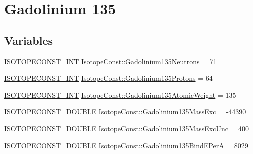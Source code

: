\hypertarget{group___isotope_const-_gadolinium-_gd135}{}\section{Gadolinium 135}
\label{group___isotope_const-_gadolinium-_gd135}
\subsection*{Variables}
\begin{DoxyCompactItemize}
\item 
\mbox{\hyperlink{group___isotope_const-_macros_ga5f18360b3e99483a35c32d789e62621c}{I\+S\+O\+T\+O\+P\+E\+C\+O\+N\+S\+T\+\_\+\+I\+NT}} \mbox{\hyperlink{group___isotope_const-_gadolinium-_gd135_ga8aeae2864824ab8d56d0caeed819ddb6}{Isotope\+Const\+::\+Gadolinium135\+Neutrons}} = 71
\item 
\mbox{\hyperlink{group___isotope_const-_macros_ga5f18360b3e99483a35c32d789e62621c}{I\+S\+O\+T\+O\+P\+E\+C\+O\+N\+S\+T\+\_\+\+I\+NT}} \mbox{\hyperlink{group___isotope_const-_gadolinium-_gd135_ga6e4139af81b5021a29691bb1646c5c4c}{Isotope\+Const\+::\+Gadolinium135\+Protons}} = 64
\item 
\mbox{\hyperlink{group___isotope_const-_macros_ga5f18360b3e99483a35c32d789e62621c}{I\+S\+O\+T\+O\+P\+E\+C\+O\+N\+S\+T\+\_\+\+I\+NT}} \mbox{\hyperlink{group___isotope_const-_gadolinium-_gd135_gab5db702f94e79419a1d3424c0980b66b}{Isotope\+Const\+::\+Gadolinium135\+Atomic\+Weight}} = 135
\item 
\mbox{\hyperlink{group___isotope_const-_macros_ga8f45a7272ce02c0b4c65c44636ed719a}{I\+S\+O\+T\+O\+P\+E\+C\+O\+N\+S\+T\+\_\+\+D\+O\+U\+B\+LE}} \mbox{\hyperlink{group___isotope_const-_gadolinium-_gd135_ga17661657c911873cee929ea57e6d03d7}{Isotope\+Const\+::\+Gadolinium135\+Mass\+Exc}} = -\/44390
\item 
\mbox{\hyperlink{group___isotope_const-_macros_ga8f45a7272ce02c0b4c65c44636ed719a}{I\+S\+O\+T\+O\+P\+E\+C\+O\+N\+S\+T\+\_\+\+D\+O\+U\+B\+LE}} \mbox{\hyperlink{group___isotope_const-_gadolinium-_gd135_ga21151e9d18f1523bfe21aa47e7528f27}{Isotope\+Const\+::\+Gadolinium135\+Mass\+Exc\+Unc}} = 400
\item 
\mbox{\hyperlink{group___isotope_const-_macros_ga8f45a7272ce02c0b4c65c44636ed719a}{I\+S\+O\+T\+O\+P\+E\+C\+O\+N\+S\+T\+\_\+\+D\+O\+U\+B\+LE}} \mbox{\hyperlink{group___isotope_const-_gadolinium-_gd135_gad5b518f1eabf311c05a1661b331f8206}{Isotope\+Const\+::\+Gadolinium135\+Bind\+E\+PerA}} = 8029
\item 

\end{DoxyCompactItemize}
